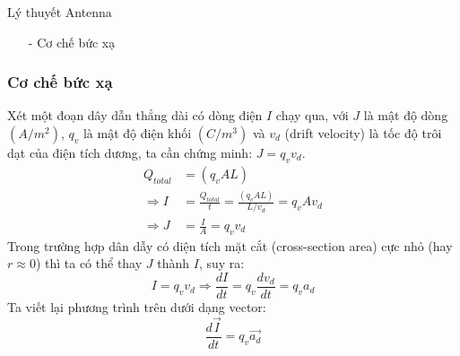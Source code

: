 \documentclass[8pt]{beamer}
\begin{document}
\begin{frame}{Lý thuyết Antenna}
\begin{itemize}
\item[-] Cơ chế bức xạ
\end{itemize}
\subsubsection{Cơ chế bức xạ}
Xét một đoạn dây dẫn thẳng dài có dòng điện $I$ chạy qua, với $J$ là mật độ dòng $(A/m^2)$, $q_{v}$ là mật độ điện khối $(C/m^3)$ và $v_{d}$ (drift velocity) là tốc độ trôi dạt của điện tích dương, ta cần chứng minh: $J=q_{v}v_{d}$.
\begin{equation*}
\begin{split}
	Q_{total}&=(q_{v}AL) \\
	\Rightarrow I&=\frac{Q_{total}}{t}=\frac{(q_{v}AL)}{L/v_{d}}=q_{v}Av_{d}\\
	\Rightarrow J&=\frac{I}{A}=q_{v}v_{d}
\end{split}
	\end{equation*}
Trong trường hợp dân dẫy có diện tích mặt cắt (cross-section area) cực nhỏ (hay $r\approx 0$) thì ta có thể thay $J$ thành $I$, suy ra:
$$I=q_{v}v_{d}\Rightarrow \frac{dI}{dt}=q_{v}\frac{dv_{d}}{dt}=q_{v}a_{d}$$
Ta viết lại phương trình trên dưới dạng vector:
$$\frac{d\overrightarrow{I}}{dt}=q_{v}\overrightarrow{a_{d}}$$
\end{frame}
\end{document}

